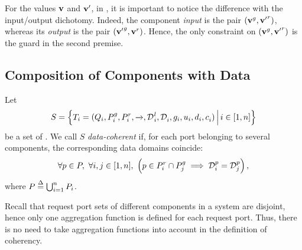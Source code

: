 \begin{note}
  \label{rem:io}
  For the values $\mathbf{v}$ and $\mathbf{v'}$, in
  , it is important to notice the difference with the
  input/output dichotomy.  Indeed, the component \emph{input} is the pair
  $({\mathbf{v}}^{g}, {\mathbf{v'}}^{r})$, whereas its
  \emph{output} is the pair $({\mathbf{v'}}^{g},
  {\mathbf{v}}^{r})$.  Hence, the only constraint on
  $({\mathbf{v}}^{g}, {\mathbf{v'}}^{r})$ is the guard in the
  second premise.
\end{note}


\subsection{Composition of Components with Data}
\label{sec:data:composition}

\begin{definition}
  \label{defn:data:coherency}
  Let \[S = \Big\{{T_i = (Q_i, {P}^{g}_i, {P}^{r}_i, \xrightarrow[]{},
    {\mathcal{D}^{}}^{l}_i, \mathcal{D}^{}_i, g_i, u_i, d_i, c^{{}}_i)}\,\Big|\,{i \in
    [1,n]}\Big\}\] be a set of \datamodel{}.  We call $S$ \emph{data-coherent}
  if, for each port belonging to several components, the corresponding data
  domains coincide:
  \begin{equation}
    \label{eq:data:coherency}
    \forall p \in P,\ \forall i,j \in [1,n],\ 
    \Big(
    p \in \pout_i \cap \pin_j \implies \data[p]_i = \data[p]_j
    \Big)\,,
  \end{equation}
  where $P \stackrel{\Delta}{=} \bigcup_{i=1}^n P_i$.
\end{definition}

Recall that request port sets of different components in a system are
disjoint, hence only one aggregation function is defined for each request
port.  Thus, there is no need to take aggregation functions into account in
the definition of coherency.

